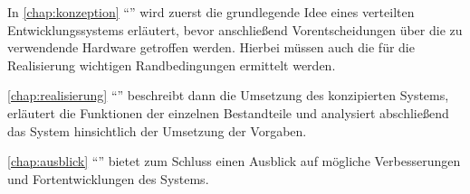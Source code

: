 In \autoref{chap:konzeption} "`"' wird zuerst die
grundlegende Idee eines verteilten Entwicklungssystems erläutert, bevor
anschließend Vorentscheidungen über die zu verwendende Hardware getroffen
werden. Hierbei müssen auch die für die Realisierung wichtigen Randbedingungen
ermittelt werden.

\autoref{chap:realisierung} "`"' beschreibt dann die
Umsetzung des konzipierten Systems, erläutert die Funktionen der einzelnen
Bestandteile und analysiert abschließend das System hinsichtlich der Umsetzung
der Vorgaben.

\autoref{chap:ausblick} "`"' bietet zum Schluss einen
Ausblick auf mögliche Verbesserungen und Fortentwicklungen des Systems.